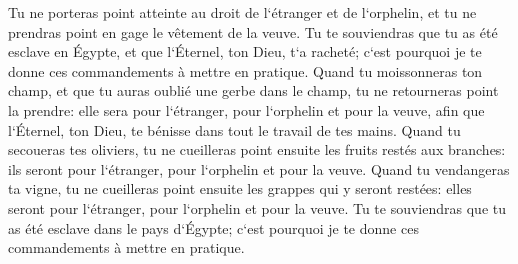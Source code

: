 \verse Tu ne porteras point atteinte au droit de l`étranger et de l`orphelin, et tu ne prendras point en gage le vêtement de la veuve. 
\verse Tu te souviendras que tu as été esclave en Égypte, et que l`Éternel, ton Dieu, t`a racheté; c`est pourquoi je te donne ces commandements à mettre en pratique. 
\verse Quand tu moissonneras ton champ, et que tu auras oublié une gerbe dans le champ, tu ne retourneras point la prendre: elle sera pour l`étranger, pour l`orphelin et pour la veuve, afin que l`Éternel, ton Dieu, te bénisse dans tout le travail de tes mains. 
\verse Quand tu secoueras tes oliviers, tu ne cueilleras point ensuite les fruits restés aux branches: ils seront pour l`étranger, pour l`orphelin et pour la veuve. 
\verse Quand tu vendangeras ta vigne, tu ne cueilleras point ensuite les grappes qui y seront restées: elles seront pour l`étranger, pour l`orphelin et pour la veuve. 
\verse Tu te souviendras que tu as été esclave dans le pays d`Égypte; c`est pourquoi je te donne ces commandements à mettre en pratique. 

\chapter{}

